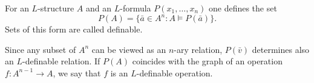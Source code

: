 For an $L$-structure $A$ and an $L$-formula $P(x_1, \ldots, x_n)$ one defines the set
$$P(A) = \{ \bar{a} \in A^n : A \vDash P(\bar{a}) \}.$$
Sets of this form are called definable.

Since any subset of $A^n$ can be viewed as an $n$-ary relation, $P(\bar{v})$ determines also an $L$-definable relation. If $P(A)$ coincides with the graph of an operation $f : A^{n-1} \rightarrow A$, we say that $f$ is an $L$-definable operation.
